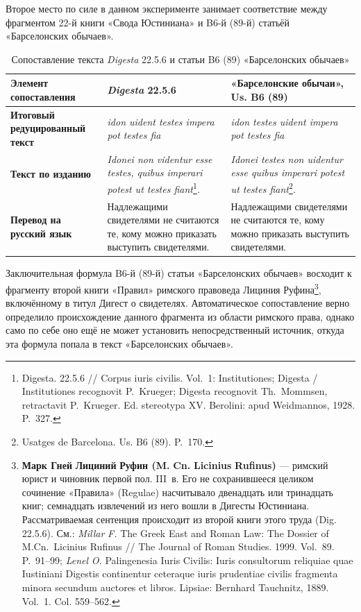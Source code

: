 Второе место по силе в данном эксперименте занимает соответствие между фрагментом 22-й книги «Свода Юстиниана» и B6-й (89-й) статьёй «Барселонских обычаев».

\begin{center}
\small
\setlength{\tabcolsep}{2pt}
\begin{longtable}{|p{}|p{}|p{}|}
\caption{Сопоставление текста \emph{Digesta} 22.5.6 и статьи B6 (89) «Барселонских обычаев»}\label{tab:ch1-digesta}\\
\hline
\textbf{Элемент сопоставления} & \textbf{\emph{Digesta}}\textbf{ 22.5.6} & \textbf{«Барселонские обычаи», }\textbf{ }\textbf{Us}\textbf{. B6 (89)} \\ \hline
\textbf{Итоговый редуцированный текст} & \emph{idon uident testes impera pot testes fia} & \emph{idon testes uident impera pot testes fia} \\ \hline
\textbf{Текст по изданию} & \emph{Idonei non videntur esse testes, quibus imperari potest ut testes fiant}\footnote{Digesta. 22.5.6 // Corpus iuris civilis. Vol.~1: Institutiones; Digesta / Institutiones recognovit P.~Krueger; Digesta recognovit Th.~Mommsen, retractavit P.~Krueger. Ed. stereotypa XV. Berolini: apud Weidmannos, 1928. P.~327.}\emph{.} & \emph{Idonei testes non uidentur esse quibus imperari potest ut testes fiant}\footnote{Usatges de Barcelona. Us. B6 (89). P.~170.}\emph{.} \\ \hline
\textbf{Перевод на русский язык} & Надлежащими свидетелями не считаются те, кому можно приказать выступить свидетелями. & Надлежащими свидетелями не считаются те, кому можно приказать выступить свидетелями. \\ \hline
\end{longtable}
\end{center}

Заключительная формула B6-й (89-й) статьи «Барселонских обычаев» восходит к фрагменту второй книги «Правил» римского правоведа Лициния Руфина\footnote{\textbf{Марк Гней }\textbf{Лициний}\textbf{ Руфин (M. }\textbf{Cn}\textbf{. }\textbf{Licinius}\textbf{ }\textbf{Rufinus}\textbf{)}\textbf{ }--- римский юрист и чиновник первой пол. III~в. Его не сохранившееся целиком сочинение «Правила» (Regulae) насчитывало двенадцать или тринадцать книг; семнадцать извлечений из него вошли в Дигесты Юстиниана. Рассматриваемая сентенция происходит из второй книги этого труда (Dig. 22.5.6). См.: \emph{Millar}\emph{ }\emph{F}\emph{.} The Greek East and Roman Law: The Dossier of M.Cn.~Licinius Rufinus // The Journal of Roman Studies. 1999. Vol.~89. P.~91--99; \emph{Lenel}\emph{ }\emph{O}\emph{.} Palingenesia Iuris Civilis: Iuris consultorum reliquiae quae Iustiniani Digestis continentur ceteraque iuris prudentiae civilis fragmenta minora secundum auctores et libros. Lipsiae: Bernhard Tauchnitz, 1889. Vol.~1. Col. 559--562.}, включённому в титул Дигест о свидетелях. Автоматическое сопоставление верно определило происхождение данного фрагмента из области римского права, однако само по себе оно ещё не может установить непосредственный источник, откуда эта формула попала в текст «Барселонских обычаев».

